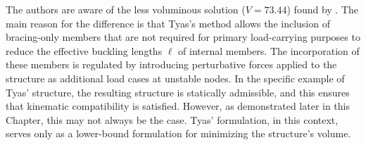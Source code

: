 The authors are aware of the less voluminous solution ($V=73.44$) found by \cite{tyas_practical_2006}. The main reason for the difference is that Tyas's method allows the inclusion of bracing-only members that are not required for primary load-carrying purposes to reduce the effective buckling lengths $\ell$ of internal members. The incorporation of these members is regulated by introducing perturbative forces applied to the structure as additional load cases at unstable nodes. In the specific example of Tyas' structure, the resulting structure is statically admissible, and this ensures that kinematic compatibility is satisfied. However, as demonstrated later in this Chapter, this may not always be the case. Tyas' formulation, in this context, serves only as a lower-bound formulation for minimizing the structure's volume.


